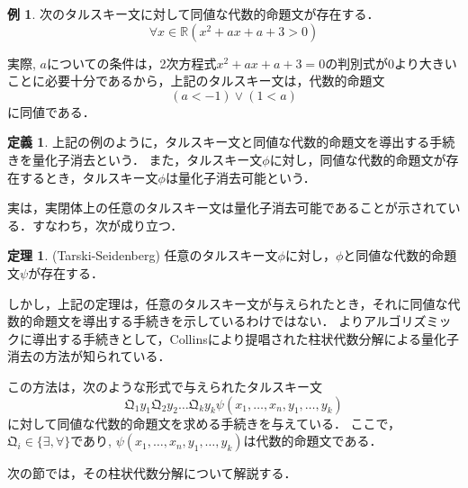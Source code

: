 \documentclass[uplatex, dvipdfmx]{jsarticle}
\newcommand{\R}{\mathbb{R}}
\newcommand{\Qua}{\mathfrak{Q}}
\theoremstyle{definition}
\newtheorem{definition}{定義}[section]
\newtheorem{theorem}{定理}[section]
\newtheorem{example}{例}[section]
\begin{document}
\begin{example}
     次のタルスキー文に対して同値な代数的命題文が存在する．
     \begin{equation*}
          \forall x \in \R (x^2 + ax + a + 3 > 0)
     \end{equation*}

     実際, $a$についての条件は，2次方程式$x^2 + ax + a + 3 = 0$の判別式が0より大きいことに必要十分であるから，上記のタルスキー文は，代数的命題文
     \begin{equation*}
          (a < -1) \lor (1 < a)
     \end{equation*}
     に同値である．
\end{example}


\begin{definition}
上記の例のように，タルスキー文と同値な代数的命題文を導出する手続きを量化子消去という．
また，タルスキー文$\phi$に対し，同値な代数的命題文が存在するとき，タルスキー文$\phi$は量化子消去可能という．
\end{definition}

実は，実閉体上の任意のタルスキー文は量化子消去可能であることが示されている．すなわち，次が成り立つ．

\begin{theorem}(Tarski-Seidenberg)
     任意のタルスキー文$\phi$に対し，$\phi$と同値な代数的命題文$\psi$が存在する．
\end{theorem}

しかし，上記の定理は，任意のタルスキー文が与えられたとき，それに同値な代数的命題文を導出する手続きを示しているわけではない．
よりアルゴリズミックに導出する手続きとして，Collinsにより提唱された柱状代数分解による量化子消去の方法が知られている．

この方法は，次のような形式で与えられたタルスキー文
\begin{equation*}
     \Qua_1 y_1 \Qua_2 y_2 \dots \Qua_k y_k \psi(x_1, \dots, x_n, y_1, \dots, y_k)
\end{equation*}
に対して同値な代数的命題文を求める手続きを与えている．
ここで，$\Qua_i \in \{\exists, \forall\}$であり, $\psi(x_1, \dots, x_n, y_1, \dots, y_k)$は代数的命題文である． 

次の節では，その柱状代数分解について解説する．


\end{document}
